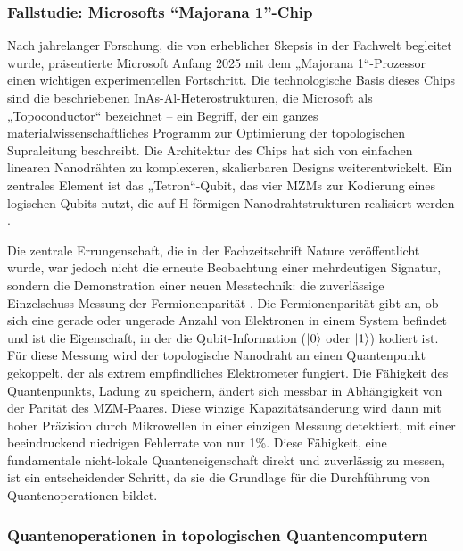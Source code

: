 \subsubsection{Fallstudie: Microsofts ``Majorana 1''-Chip}

Nach jahrelanger Forschung, die von erheblicher Skepsis in der Fachwelt begleitet wurde, präsentierte Microsoft Anfang 2025 mit dem „Majorana 1“-Prozessor einen wichtigen experimentellen Fortschritt. Die technologische Basis dieses Chips sind die beschriebenen InAs-Al-Heterostrukturen, die Microsoft als „Topoconductor“ bezeichnet – ein Begriff, der ein ganzes materialwissenschaftliches Programm zur Optimierung der topologischen Supraleitung beschreibt. Die Architektur des Chips hat sich von einfachen linearen Nanodrähten zu komplexeren, skalierbaren Designs weiterentwickelt. Ein zentrales Element ist das „Tetron“-Qubit, das vier MZMs zur Kodierung eines logischen Qubits nutzt, die auf H-förmigen Nanodrahtstrukturen realisiert werden \cite{bolgarMicrosoftsMajorana1}.

Die zentrale Errungenschaft, die in der Fachzeitschrift Nature veröffentlicht wurde, war jedoch nicht die erneute Beobachtung einer mehrdeutigen Signatur, sondern die Demonstration einer neuen Messtechnik: die zuverlässige Einzelschuss-Messung der Fermionenparität \cite{PDFMicrosoftsMajorana2025}. Die Fermionenparität gibt an, ob sich eine gerade oder ungerade Anzahl von Elektronen in einem System befindet und ist die Eigenschaft, in der die Qubit-Information ($\ket{0}$ oder $\ket{1}$) kodiert ist.
Für diese Messung wird der topologische Nanodraht an einen Quantenpunkt gekoppelt, der als extrem empfindliches Elektrometer fungiert. Die Fähigkeit des Quantenpunkts, Ladung zu speichern, ändert sich messbar in Abhängigkeit von der Parität des MZM-Paares. Diese winzige Kapazitätsänderung wird dann mit hoher Präzision durch Mikrowellen in einer einzigen Messung detektiert, mit einer beeindruckend niedrigen Fehlerrate von nur 1\%. Diese Fähigkeit, eine fundamentale nicht-lokale Quanteneigenschaft direkt und zuverlässig zu messen, ist ein entscheidender Schritt, da sie die Grundlage für die Durchführung von Quantenoperationen bildet. \cite{PDFMicrosoftsMajorana2025}


\subsubsection{Quantenoperationen in topologischen Quantencomputern}

